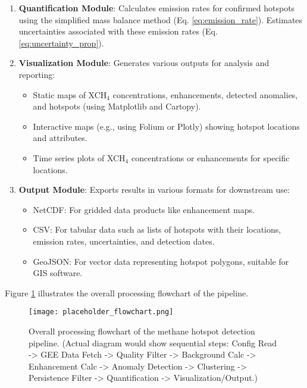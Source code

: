 \documentclass[12pt,a4paper]{article}
\begin{document}
\begin{enumerate}
    \item \textbf{Quantification Module}:
    Calculates emission rates for confirmed hotspots using the simplified mass balance method (Eq. \ref{eq:emission_rate}). Estimates uncertainties associated with these emission rates (Eq. \ref{eq:uncertainty_prop}).

    \item \textbf{Visualization Module}:
    Generates various outputs for analysis and reporting:
    \begin{itemize}
        \item Static maps of XCH$_4$ concentrations, enhancements, detected anomalies, and hotspots (using Matplotlib and Cartopy).
        \item Interactive maps (e.g., using Folium or Plotly) showing hotspot locations and attributes.
        \item Time series plots of XCH$_4$ concentrations or enhancements for specific locations.
    \end{itemize}

    \item \textbf{Output Module}:
    Exports results in various formats for downstream use:
    \begin{itemize}
        \item NetCDF: For gridded data products like enhancement maps.
        \item CSV: For tabular data such as lists of hotspots with their locations, emission rates, uncertainties, and detection dates.
        \item GeoJSON: For vector data representing hotspot polygons, suitable for GIS software.
    \end{itemize}
\end{enumerate}

Figure \ref{fig:flowchart} illustrates the overall processing flowchart of the pipeline.

\begin{figure}[H]
    \centering
    \texttt{[image: placeholder\_flowchart.png]} %
    \caption{Overall processing flowchart of the methane hotspot detection pipeline. (Actual diagram would show sequential steps: Config Read -> GEE Data Fetch -> Quality Filter -> Background Calc -> Enhancement Calc -> Anomaly Detection -> Clustering -> Persistence Filter -> Quantification -> Visualization/Output.)}
    \label{fig:flowchart}
\end{figure}
\end{document}
